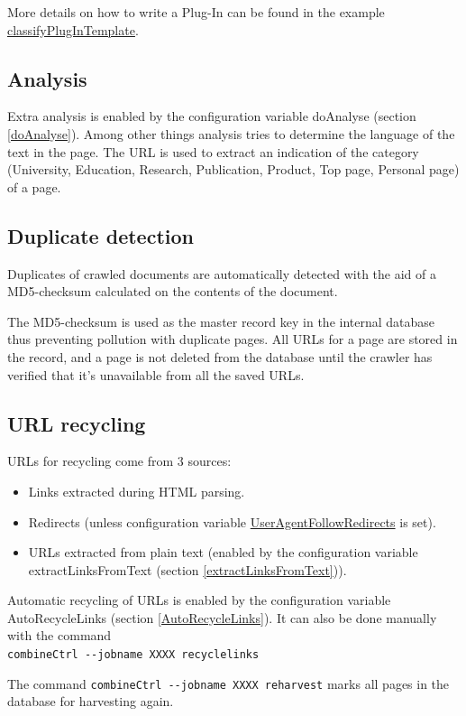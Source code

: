 More details on how to write a Plug-In can be found in the example
\hyperref{classifyPlugInTemplate.pm}{classifyPlugInTemplate.pm (see Appendix }{)}{classifyPlugInTemplate}.

\subsection{Analysis}
Extra analysis is enabled by the configuration variable 
doAnalyse (section \ref{doAnalyse}). Among other things analysis tries to determine 
the language of the text in the page. The URL is used to extract an
indication of the category (University, Education, Research,
Publication, Product, Top page, Personal
page) of a page.

\subsection{Duplicate detection}
Duplicates of crawled documents are automatically detected with the
aid of a MD5-checksum calculated on the contents of the document.

The MD5-checksum is used as the master record key in the internal
database thus preventing pollution with duplicate pages. All URLs
for a page are stored in the record, and a page is not deleted from
the database until the crawler has verified that it's unavailable
from all the saved URLs.

\subsection{URL recycling}
URLs for recycling come from 3 sources:
\begin{itemize}
\item Links extracted during HTML parsing.
\item Redirects (unless configuration variable \hyperref{UserAgentFollowRedirects}{UserAgentFollowRedirects (section }{)}{UserAgentFollowRedirects} is set).
\item URLs extracted from plain text (enabled by the configuration variable
extractLinksFromText (section \ref{extractLinksFromText})).
\end{itemize}

Automatic recycling of URLs is enabled by the configuration variable
AutoRecycleLinks (section \ref{AutoRecycleLinks}). It can also be done
manually with the command\\
\verb+combineCtrl --jobname XXXX recyclelinks+

The command \verb+combineCtrl --jobname XXXX reharvest+ marks all
pages in the database for harvesting again.

